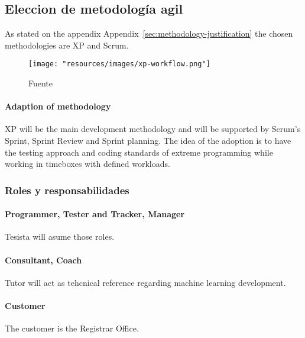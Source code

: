\subsection{Eleccion de metodología agil}

As stated on the appendix Appendix~\ref{sec:methodology-justification} the chosen methodologies are XP and Scrum.

\begin{figure}
    \texttt{[image: "resources/images/xp-workflow.png"]}
    \caption{Fuente \textcite{abrahamsson2017agile}}\label{fig:xp-workflow}
\end{figure}

\paragraph{Adaption of methodology} XP will be the main development methodology and will be supported by Scrum's Sprint, Sprint Review and Sprint planning.
The idea of the adoption is to have the testing approach and coding standards of extreme programming while working in timeboxes with defined workloads.

\subsubsection{Roles y responsabilidades}

\paragraph{Programmer, Tester and Tracker, Manager} Tesista will asume those roles.

\paragraph{Consultant, Coach} Tutor will act as tehcnical reference regarding machine learning development.

\paragraph{Customer} The customer is the Registrar Office.
